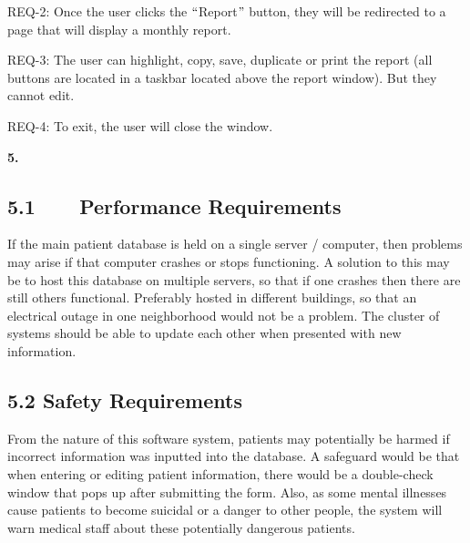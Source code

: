 \documentclass[12pt]{article}
\renewcommand{\_}{\kern-1.5pt\textunderscore\kern-1.5pt}
\begin{document}
\begin{adjustwidth}{0.5in}{0.0in}
REQ-2: Once the user clicks the $``$Report$"$  button, they will be redirected to a page that will display a monthly report.\par

\end{adjustwidth}

\begin{adjustwidth}{0.5in}{0.0in}
REQ-3: The user can highlight, copy, save, duplicate or print the report (all buttons are located in a taskbar located above the report window). But they cannot edit.\par

\end{adjustwidth}

\begin{adjustwidth}{0.5in}{0.0in}
REQ-4: To exit, the user will close the window.\par

\end{adjustwidth}


\vspace{\baselineskip}
{\fontsize{23pt}{27.6pt}\selectfont \textbf{5.}{\fontsize{7pt}{8.4pt}\selectfont  {}\par}\par}\par

\setlength{\parskip}{3.96pt}
\subsection*{5.1\ \ \ \  Performance Requirements}
If the main patient database is held on a single server / computer, then problems may arise if that computer crashes or stops functioning. A solution to this may be to host this database on multiple servers, so that if one crashes then there are still others functional. Preferably hosted in different buildings, so that an electrical outage in one neighborhood would not be a problem. The cluster of systems should be able to update each other when presented with new information. \par

\subsection*{5.2 \hspace*{10pt}Safety Requirements}
From the nature of this software system, patients may potentially be harmed if incorrect information was inputted into the database. A safeguard would be that when entering or editing patient information, there would be a double-check window that pops up after submitting the form. Also, as some mental illnesses cause patients to become suicidal or a danger to other people, the system will warn medical staff about these potentially dangerous patients.\par
\end{document}
